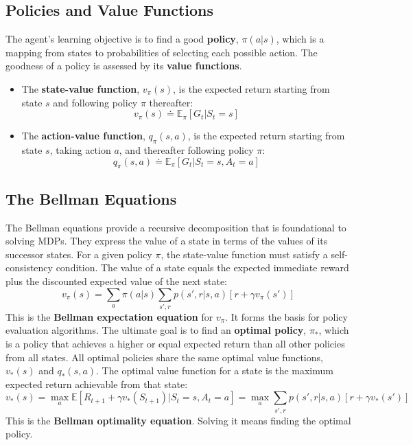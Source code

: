\subsection{Policies and Value Functions}
The agent's learning objective is to find a good \textbf{policy}, $\pi(a|s)$, which is a mapping from states to probabilities of selecting each possible action. The goodness of a policy is assessed by its \textbf{value functions}.
\begin{itemize}
    \item The \textbf{state-value function}, $v_\pi(s)$, is the expected return starting from state $s$ and following policy $\pi$ thereafter:
    \begin{equation}
        v_\pi(s) \doteq \mathbb{E}_\pi [G_t | S_t=s]
    \end{equation}
    \item The \textbf{action-value function}, $q_\pi(s, a)$, is the expected return starting from state $s$, taking action $a$, and thereafter following policy $\pi$:
    \begin{equation}
        q_\pi(s, a) \doteq \mathbb{E}_\pi [G_t | S_t=s, A_t=a]
    \end{equation}
\end{itemize}

\subsection{The Bellman Equations}
The Bellman equations provide a recursive decomposition that is foundational to solving MDPs. They express the value of a state in terms of the values of its successor states. For a given policy $\pi$, the state-value function must satisfy a self-consistency condition. The value of a state equals the expected immediate reward plus the discounted expected value of the next state:
\begin{equation}
    v_\pi(s) = \sum_a \pi(a|s) \sum_{s', r} p(s', r | s, a) [r + \gamma v_\pi(s')]
\end{equation}
This is the \textbf{Bellman expectation equation} for $v_\pi$. It forms the basis for policy evaluation algorithms. The ultimate goal is to find an \textbf{optimal policy}, $\pi_*$, which is a policy that achieves a higher or equal expected return than all other policies from all states. All optimal policies share the same optimal value functions, $v_*(s)$ and $q_*(s, a)$. The optimal value function for a state is the maximum expected return achievable from that state:
\begin{equation} \label{eq:bellman-optimal}
    v_*(s) = \max_a \mathbb{E}[R_{t+1} + \gamma v_*(S_{t+1}) | S_t=s, A_t=a] = \max_a \sum_{s', r} p(s', r | s, a) [r + \gamma v_*(s')]
\end{equation}
This is the \textbf{Bellman optimality equation}. Solving it means finding the optimal policy.

